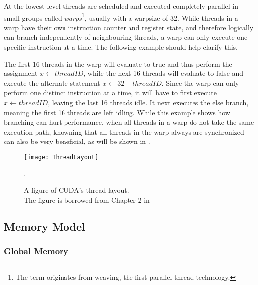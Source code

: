 At the lowest level threads are scheduled and executed completely
parallel in small groups called \textit{warps}\footnote{The term
  originates from weaving, the first parallel thread
  technology.}, usually with a warpsize of 32. While
threads in a warp have their own instruction counter and register
state, and therefore logically can branch independently of
neighbouring threads, a warp can only execute one specific instruction
at a time. The following example should help clarify this.

\begin{algorithmic}
  \ELSE
  \ENDIF
\end{algorithmic}

The first 16 threads in the warp will evaluate to true and thus
perform the assignment $x \leftarrow threadID$, while the next 16
threads will evaluate to false and execute the alternate statement $x
\leftarrow 32 - threadID$. Since the warp can only perform one
distinct instruction at a time, it will have to first execute $x
\leftarrow threadID$, leaving the last 16 threads idle. It next
executes the else branch, meaning the first 16 threads are left
idling. While this example shows how branching can hurt performance,
when all threads in a warp do not take the same execution path,
knowning that all threads in the warp always are synchronized can also
be very beneficial, as will be shown in
.

\begin{figure}
  \centering
  \texttt{[image: ThreadLayout]}
  \caption{A figure of CUDA's thread layout.\\ The figure is borrowed
    from Chapter 2 in }.
  \label{fig:gflops}
\end{figure}




\subsection{Memory Model}

\subsubsection{Global Memory}


